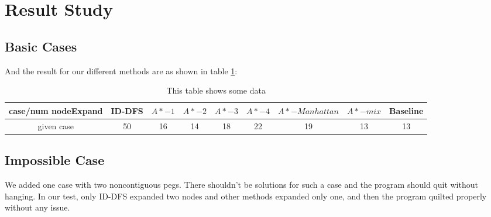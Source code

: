 \documentclass[11pt,letter]{article}
\begin{document}
\section {Result Study}
\subsection {Basic Cases}
And the result for our different methods are as shown in table \ref{tab_resbasic}:
\begin{table}[h!]
  \centering
  \begin{tabular}{ | c | c |  c | c | c | c |  c | c| c|}
\hline
case/num nodeExpand & ID-DFS & $A*- 1$ & $A*-2$ & $A*-3$ & $A*-4$ & $A*-Manhattan$ & $A*-mix$ & Baseline \\ \hline
given case & 50 & 16 & 14 & 18 & 22 & 19 & 13 & 13 \\ \hline
  \end{tabular}
  \caption{This table shows some data}
  \label{tab_resbasic}
\end{table}

\subsection {Impossible Case}
We added one case with two noncontiguous pegs. There shouldn't be solutions for such a case and the program should quit without hanging. In our test, only ID-DFS expanded two nodes and other methods expanded only one, and then the program quilted properly without any issue.
\end{document}
